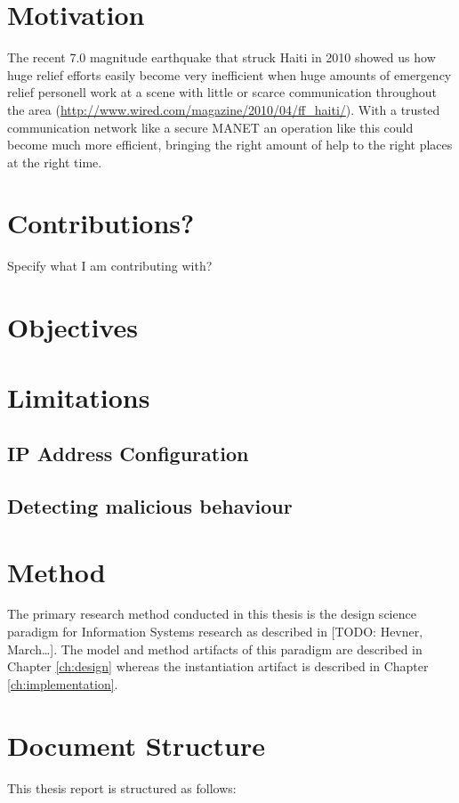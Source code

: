 \section{Motivation}
The recent 7.0 magnitude earthquake that struck Haiti in 2010 showed us how huge
relief efforts easily become very inefficient when huge amounts of emergency
relief personell work at a scene with little or scarce communication throughout
the area (\url{http://www.wired.com/magazine/2010/04/ff_haiti/}). With a trusted
communication network like a secure \ac{MANET} an operation like this could
become much more efficient, bringing the right amount of help to the right
places at the right time.

\section{Contributions?}
Specify what I am contributing with?

\section{Objectives}

\section{Limitations}

\subsection{IP Address Configuration}
\label{limit:ip_address_conf}

\subsection{Detecting malicious behaviour}
\label{limit:malicious_behaviour}


\section{Method}
The primary research method conducted in this thesis is the design science
paradigm for Information Systems research as described in [TODO: Hevner,
March\ldots]. The model and method artifacts of this paradigm are described in
Chapter \ref{ch:design} whereas the instantiation artifact is described in
Chapter \ref{ch:implementation}.

\section{Document Structure}
This thesis report is structured as follows:


